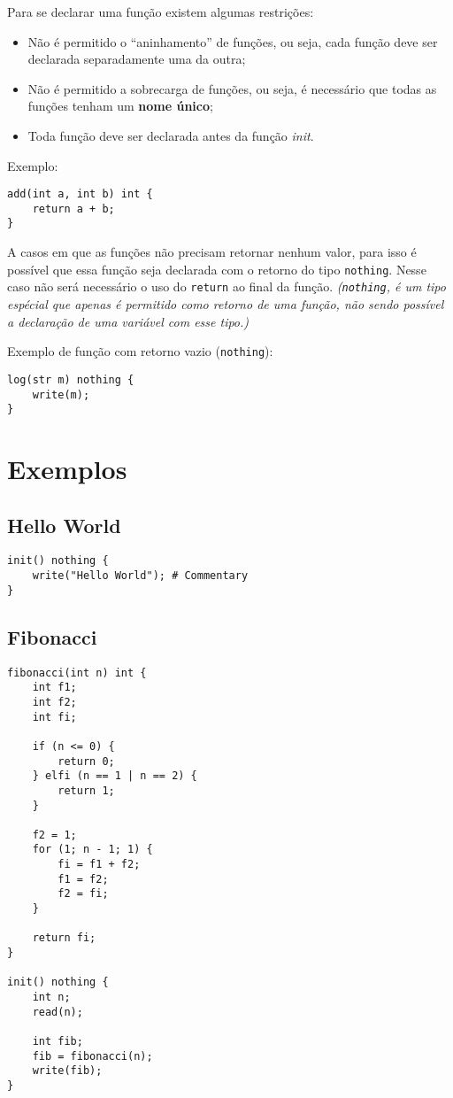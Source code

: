 \documentclass[a4paper,12pt]{article}
\begin{document}
Para se declarar uma função existem algumas restrições:
\begin{itemize}
    \item Não é permitido o ``aninhamento'' de funções, ou seja, cada função deve ser declarada
    separadamente uma da outra;
    \item Não é permitido a sobrecarga de funções, ou seja, é necessário que todas as funções
    tenham um \textbf{nome único};
    \item Toda função deve ser declarada antes da função \textit{init}.
\end{itemize}

Exemplo:
\begin{lstlisting}
add(int a, int b) int {
    return a + b;
}
\end{lstlisting}

A casos em que as funções não precisam retornar nenhum valor, para isso é possível que essa função
seja declarada com o retorno do tipo \texttt{nothing}. Nesse caso não será necessário o uso do
\texttt{return} ao final da função. \textit{(\texttt{nothing}, é um tipo espécial que apenas é
permitido como retorno de uma função, não sendo possível a declaração de uma variável com esse tipo.)}

Exemplo de função com retorno vazio (\texttt{nothing}):
\begin{lstlisting}
log(str m) nothing {
    write(m);
}
\end{lstlisting}

\section{Exemplos}

\subsection{Hello World}
\begin{lstlisting}
init() nothing {
    write("Hello World"); # Commentary
}
\end{lstlisting}

\subsection{Fibonacci}
\begin{lstlisting}
fibonacci(int n) int {
    int f1;
    int f2;
    int fi;

    if (n <= 0) {
        return 0;
    } elfi (n == 1 | n == 2) {
        return 1;
    }

    f2 = 1;
    for (1; n - 1; 1) {
        fi = f1 + f2;
        f1 = f2;
        f2 = fi;
    }

    return fi;
}

init() nothing {
    int n;
    read(n);
    
    int fib;
    fib = fibonacci(n);
    write(fib);
}
\end{lstlisting}
\end{document}
